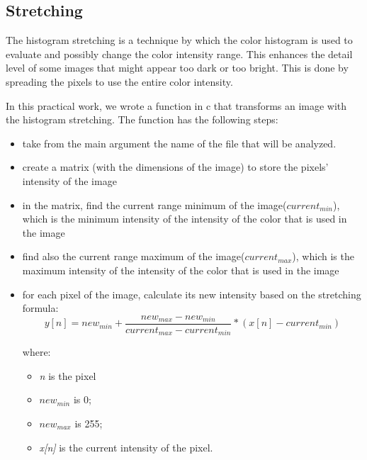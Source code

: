 \documentclass{article}
\begin{document}
	\subsection{Stretching}

	The histogram stretching is a technique by which the color histogram is used to evaluate and possibly change the color intensity range. This enhances the 		detail level of some images that might appear too dark or too bright. This is done by spreading the pixels to use the entire color intensity.
	
	In this practical work, we wrote a function in c that transforms an image with the histogram stretching. The function has the following steps:
	\begin{itemize}
  		\item take from the main argument the name of the file that will be analyzed.
  		\item create a matrix (with the dimensions of the image) to store the pixels' intensity of the image
  		\item in the matrix, find the current range minimum of the image({\it $current_{min}$}), which is the minimum intensity of the intensity of the color 			that is used in the image
  		\item find also the current range maximum of the image({\it $current_{max}$}), which is the maximum intensity of the intensity of the color that is 			used in the image
  		\item for each pixel of the image, calculate its new intensity based on the stretching formula:
		\begin{equation}
			y[n]=new_{min}+\frac{new_{max}-new_{min}}{current_{max}-current_{min}}*(x[n]-current_{min})
			\label{eq:stretching}
		\end{equation}
	
		where: 
			\begin{itemize}
	  			\item {\it n} is the pixel		
	  			\item {\it $new_{min}$} is 0;
	  			\item {\it $new_{max}$} is 255; 
	  			\item {\it x[n]} is the current intensity of the pixel.
			\end{itemize}
	\end{itemize}
\end{document}
